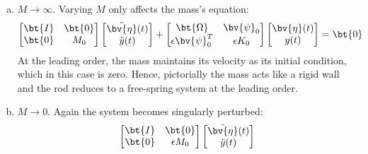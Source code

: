 \begin{enumerate}[(i)]
{\begin{enumerate}[(a)]
{\begin{equation}
            \begin{bmatrix}
                \bv{\eta}(t) \\ y(t)
            \end{bmatrix} = \bt{0}
        \end{equation}
        which is not uniformly valid for all time. 
        Nonetheless, at leading order the scalar equation in $y(t)$ implies that the spring's deformation is small.
        This, in turn, suggests that the $u(L, t)$ is small if rigid body motion is suppressed (free-fixed BC). 
    }
    \item {
        \emph{$M\rightarrow \infty$}. Varying $M$ only affects the mass's equation:
        \begin{equation}
            \begin{bmatrix}
                \bt{I} & \bt{0} \\ 
                \bt{0} & M_0
            \end{bmatrix} 
            \begin{bmatrix}
                \ddot{\bv{\eta}}(t) \\ \ddot{y}(t)
            \end{bmatrix} + 
            \begin{bmatrix}
                \bt{\Omega} & \bv{\psi}_0 \\
                \epsilon \bv{\psi}_0^T & \epsilon K_0 
            \end{bmatrix}
            \begin{bmatrix}
                \bv{\eta}(t) \\ y(t)
            \end{bmatrix} = \bt{0}
        \end{equation}
        At the leading order, the mass maintains its velocity as its initial condition, which in this case is zero. 
        Hence, pictorially the mass acts like a rigid wall and the rod reduces to a free-spring system at the leading order.
    }
    \item {
        \emph{$M\rightarrow 0$}. Again the system becomes singularly perturbed:
        \begin{equation}
            \begin{bmatrix}
                \bt{I} & \bt{0} \\ 
                \bt{0} & \epsilon M_0
            \end{bmatrix} 
            \begin{bmatrix}
                \ddot{\bv{\eta}}(t) \\ \ddot{y}(t)

\end{bmatrix}
\end{equation}}
\end{enumerate}}
\end{enumerate}

